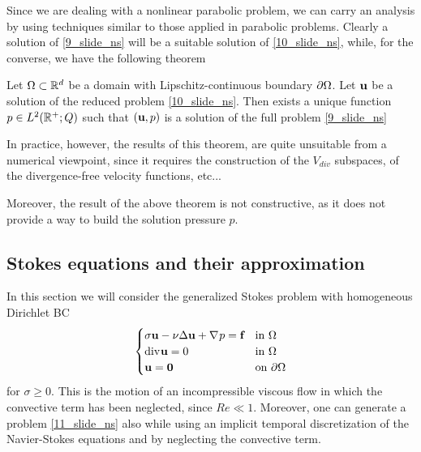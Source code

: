 Since we are dealing with a nonlinear parabolic problem, we can carry an analysis by using techniques similar to those applied in parabolic problems. Clearly a solution of \eqref{9_slide_ns} will be a suitable solution of \eqref{10_slide_ns}, while, for the converse, we have the following theorem 
\begin{theorem}
    Let \(\Omega \subset \mathbb{R}^d\) be a domain with Lipschitz-continuous boundary \(\partial\Omega\). Let \(\textbf{u}\) be a solution of the reduced problem \eqref{10_slide_ns}. Then exists a unique function \(p \in L^2(\mathbb{R}^+;Q)\) such that \((\textbf{u}, p)\) is a solution of the full problem \eqref{9_slide_ns}
\end{theorem}
In practice, however, the results of this theorem, are quite unsuitable from a numerical viewpoint, since it requires the construction of the \(V_{div}\) subspaces, of the divergence-free velocity functions, etc... 

Moreover, the result of the above theorem is not constructive, as it does not provide a way to build the solution pressure \(p\).
\subsection{Stokes equations and their approximation}
In this section we will consider the generalized Stokes problem with homogeneous Dirichlet BC 
\begin{equation}
    \begin{cases}
        \sigma \textbf{u} - \nu \Delta \textbf{u} + \nabla\mspace{1mu} p = \textbf{f} & \text{in } \Omega \\
        \text{div}\mspace{1mu} \textbf{u} = 0 & \text{in } \Omega \\
        \textbf{u} = \textbf{0} & \text{on }\partial\Omega
    \end{cases}
        \label{11_slide_ns}
\end{equation}
for \(\sigma \geq 0\). 
This is the motion of an incompressible viscous flow in which the convective term has been neglected, since \(Re \ll 1\).
Moreover, one can generate a problem \eqref{11_slide_ns} also while using an implicit temporal discretization of the Navier-Stokes equations and by neglecting the convective term. 

